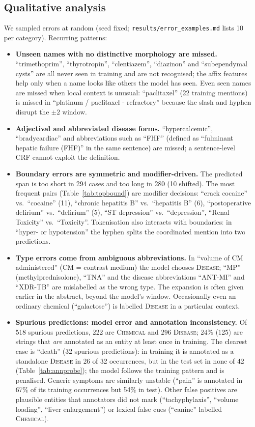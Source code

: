 \documentclass[10pt,a4paper]{article}
\newcommand{\chem}{\textsc{Chemical}}
\newcommand{\dis}{\textsc{Disease}}
\begin{document}


\subsection{Qualitative analysis}
We sampled errors at random (seed fixed; \texttt{results/error\_examples.md} lists 10 per category). Recurring patterns:

\begin{itemize}
\item \textbf{Unseen names with no distinctive morphology are missed.} ``trimethoprim'', ``thyrotropin'', ``clentiazem'', ``diazinon'' and ``subependymal cysts'' are all never seen in training and are not recognised; the
affix features help only when a name looks like others the model has seen. Even seen names are missed when local context is unusual: ``paclitaxel'' (22 training mentions) is missed in ``platinum / paclitaxel - refractory''
because the slash and hyphen disrupt the $\pm2$ window.
\item \textbf{Adjectival and abbreviated disease forms.} ``hypercalcemic'', ``bradycardiac'' and abbreviations such as ``FHF'' (defined as ``fulminant hepatic failure (FHF)'' in the same sentence) are missed; a sentence-level CRF cannot exploit the definition.
\item \textbf{Boundary errors are symmetric and modifier-driven.} The predicted span is too short in 294 cases and too long in 280 (10 shifted). The most frequent pairs (Table~\ref{tab:topbound}) are modifier decisions:
``crack cocaine'' vs.\ ``cocaine'' (11), ``chronic hepatitis B'' vs.\ ``hepatitis B'' (6), ``postoperative delirium'' vs.\ ``delirium'' (5), ``ST depression'' vs.\ ``depression'', ``Renal Toxicity'' vs.\ ``Toxicity''.
Tokenisation also interacts with boundaries: in ``hyper- or hypotension'' the hyphen splits the coordinated mention into two predictions.
\item \textbf{Type errors come from ambiguous abbreviations.} In ``volume of CM administered'' (CM = contrast medium) the model chooses \dis{}; ``MP'' (methylprednisolone), ``TNA'' and the disease abbreviations ``ANT-MI'' and ``XDR-TB''
are mislabelled as the wrong type. The expansion is often given earlier in the abstract, beyond the model's window. Occasionally even an ordinary chemical (``galactose'') is labelled \dis{} in a particular context.
\item \textbf{Spurious predictions: model error and annotation inconsistency.} Of 518 spurious predictions, 222 are \chem{} and 296 \dis{}; 24\% (125) are strings that \emph{are} annotated as an entity at least once in training.
The clearest case is ``death'' (32 spurious predictions): in training it is annotated as a standalone \dis{} in 26 of 32 occurrences, but in the test set in none of 42 (Table~\ref{tab:annprobe}); the model follows the training pattern and is penalised.
Generic symptoms are similarly unstable (``pain'' is annotated in 67\% of its training occurrences but 54\% in test). Other false positives are plausible entities that annotators did not mark (``tachyphylaxis'', ``volume loading'', ``liver enlargement'')
or lexical false cues (``canine'' labelled \chem{}).
\end{itemize}
\end{document}
